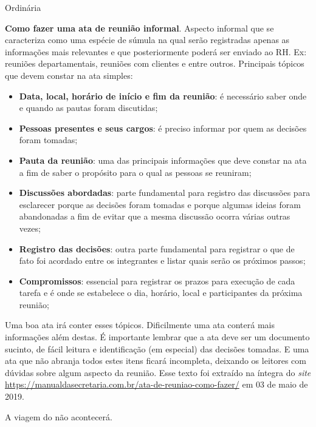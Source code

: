 \documentclass[11pt,twoside]{ata}
\date{03 de dezembro de 2019}
\begin{document}
\begin{reuniao}{Ordinária} %

\begin{informes}
\item \textbf{Como fazer uma ata de reunião informal}. Aspecto informal que se caracteriza como uma espécie de súmula na qual serão registradas apenas as informações mais relevantes e que posteriormente poderá ser enviado ao RH. Ex: reuniões departamentais, reuniões com clientes e entre outros. Principais tópicos que devem constar na ata simples:
\begin{itemize}
    \item \textbf{Data, local, horário de início e fim da reunião}: é necessário saber onde e quando as pautas foram discutidas;
    \item \textbf{Pessoas presentes e seus cargos}: é preciso informar por quem as decisões foram tomadas;
    \item \textbf{Pauta da reunião}: uma das principais informações que deve constar na ata a fim de saber o propósito para o qual as pessoas se reuniram;
    \item \textbf{Discussões abordadas}: parte fundamental para registro das discussões para esclarecer porque as decisões foram tomadas e porque algumas ideias foram abandonadas a fim de evitar que a mesma discussão ocorra várias outras vezes;
    \item \textbf{Registro das decisões}: outra parte fundamental para registrar o que de fato foi acordado entre os integrantes e listar quais serão os próximos passos;
    \item \textbf{Compromissos}: essencial para registrar os prazos para execução de cada tarefa e é onde se estabelece o dia, horário, local e participantes da próxima reunião;
\end{itemize}
Uma boa ata irá conter esses tópicos. Dificilmente uma ata conterá mais informações além destas. É importante lembrar que a ata deve ser um documento sucinto, de fácil leitura e identificação (em especial) das decisões tomadas. E uma ata que não abranja todos estes itens ficará incompleta, deixando os leitores com dúvidas sobre algum aspecto da reunião. Esse texto foi extraído na íntegra do \textit{site} \url{https://manualdasecretaria.com.br/ata-de-reuniao-como-fazer/} em 03 de maio de 2019.

\item A viagem do  não acontecerá.
\end{informes}


\end{reuniao}
\end{document}
